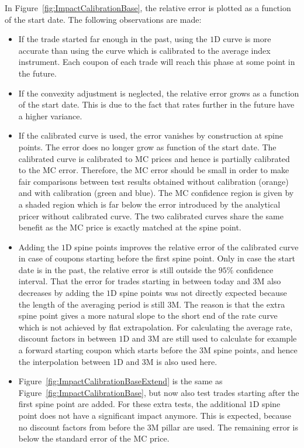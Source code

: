 \documentclass[]{pmv_report} %
\begin{document}
In Figure~\ref{fig:ImpactCalibrationBase}, the relative error is plotted as a function of the start date.
The following observations are made:
\begin{itemize}
 \item If the trade started far enough in the past, using the $1$D curve is more accurate than using the curve which is calibrated to the average index instrument.
 Each coupon of each trade will reach this phase at some point in the future.
 \item If the convexity adjustment is neglected, the relative error grows as a function of the start date.
 This is due to the fact that rates further in the future have a higher variance.
 \item If the calibrated curve is used, the error vanishes by construction at spine points.
 The error does no longer grow as function of the start date.
 The calibrated curve is calibrated to MC prices and hence is partially calibrated to the MC error.
 Therefore, the MC error should be small in order to make fair comparisons between test results obtained without calibration (orange) and with calibration (green and blue).
 The MC confidence region is given by a shaded region which is far below the error introduced by the analytical pricer without calibrated curve.
 The two calibrated curves share the same benefit as the MC price is exactly matched at the spine point.
 \item Adding the $1$D spine points improves the relative error of the calibrated curve in case of coupons starting before the first spine point.
 Only in case the start date is in the past, the relative error is still outside the $95\%$ confidence interval.
 That the error for trades starting in between today and 3M also decreases by adding the $1$D spine points was not directly expected because the length of the averaging period is still $3$M.
 The reason is that the extra spine point gives a more natural slope to the short end of the rate curve which is not achieved by flat extrapolation.
 For calculating the average rate, discount factors in between $1$D and $3$M are still used to calculate for example a forward starting coupon which starts before the $3$M spine points, and hence the interpolation between $1$D and $3$M is also used here.
\item Figure~\ref{fig:ImpactCalibrationBaseExtend} is the same as Figure~\ref{fig:ImpactCalibrationBase}, but now also test trades starting after the first spine point are added.
 For these extra tests, the additional $1$D spine point does not have a significant impact anymore.
 This is expected, because no discount factors from before the $3$M pillar are used.
 The remaining error is below the standard error of the MC price.
\end{itemize}
\end{document}
